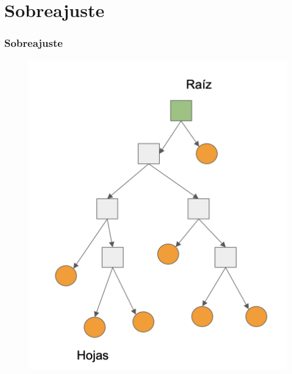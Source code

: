 \documentclass[
  shownotes,
  xcolor={svgnames},
  hyperref={colorlinks,citecolor=DarkBlue,linkcolor=andesred,urlcolor=DarkBlue}
  , aspectratio=169]{beamer}
\begin{document}
\section{Sobreajuste}
\begin{frame}[fragile]
\frametitle{Sobreajuste}


  
\begin{figure}[H] \centering
            \captionsetup{justification=centering}
              \includegraphics[scale=0.4]{figures/tree_uba.png}
 \end{figure}

\end{frame}
\end{document}
